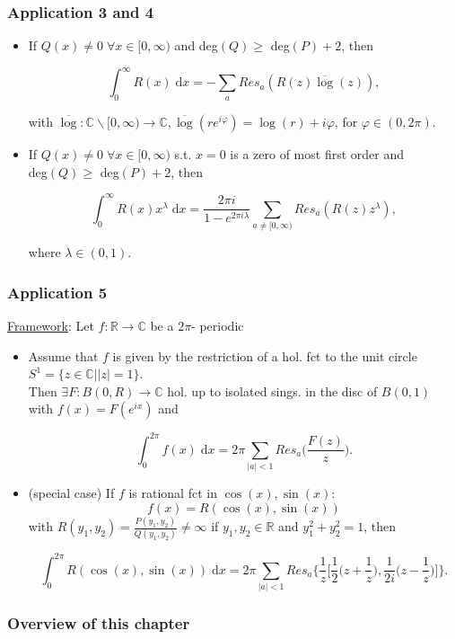 \documentclass[10pt]{beamer}
\newcommand{\R}{\mathbb{R}}
\newcommand{\C}{\mathbb{C}}
\begin{document}
{\begin{frame} \frametitle{Application 3 and 4}
\begin{itemize}
\item[(3)] If $Q(x)\neq 0\; \forall x \in [0,\infty)$ and deg$(Q) \geq$ deg$(P)+2$, then
\begin{block}{}
$$ \int_{0}^\infty R(x)\; \text{d}x=-\sum_{a} Res_a(R(z)\overline{\log}(z)),$$
\end{block}
with $\overline{\log}: \C \backslash [0,\infty) \rightarrow \C, \overline{\log}(re^{i\varphi})=\log(r)+i\varphi$, for $\varphi\in (0, 2\pi)$.\\
\vspace{0.2cm}
\item[(4)] If $Q(x)\neq 0\; \forall x \in [0,\infty)$ s.t. $x=0$ is a zero of most first order and \\deg$(Q) \geq$ deg$(P)+2$, then
\begin{block}{}
$$ \int_{0}^\infty R(x) x^\lambda\; \text{d}x=\frac{2\pi i}{1-e^{2\pi i \lambda}} \sum_{a \neq [0, \infty)} Res_a(R(z) z^\lambda),$$
\end{block}
where $\lambda \in (0,1)$.
\end{itemize}
\end{frame}

\begin{frame} \frametitle{Application 5}
 \underline{Framework}: Let $f: \R \rightarrow \C$ be a $2\pi$- periodic
\begin{itemize}
\item[(5)] Assume that $f$ is given by the restriction of a hol. fct to the unit circle $S^1=\{z \in \C | |z|=1\}.$\\
Then $\exists F:B(0,R)\rightarrow \C$ hol. up to isolated sings. in the disc of $B(0,1)$ with $f(x)=F(e^{ix})$ and 
\begin{block}{}
$$ \int_{0}^{2\pi} f(x)\; \text{d}x=2\pi\sum_{|a|<1} Res_a\Bigg(\frac{F(z)}{z}\Bigg).$$
\end{block}
\item[(5*)] (special case) If $f$ is rational fct in $\cos(x), \sin(x)$:
$$f(x)=R(\cos(x),\sin(x))$$
with
$R(y_1,y_2)=\frac{P(y_1,y_2)}{Q(y_1,y_2)} \neq \infty$ if $y_1,y_2 \in \R$ and $y_1^2+y_2^2=1$, then
\begin{block}{}
$$ \int_{0}^{2\pi} R(\cos(x),\sin(x))\; \text{d}x=2\pi \sum_{|a|<1} Res_{a} \Bigg\{\frac{1}{z}\Bigg[\frac{1}{2}\Big(z+\frac{1}{z}\Big),\frac{1}{2i}\Big(z-\frac{1}{z}\Big)\Bigg]\Bigg\}.$$
\end{block}
\end{itemize}
\end{frame}

\begin{frame} \frametitle{Overview of this chapter}

\end{frame}


}
\end{document}
